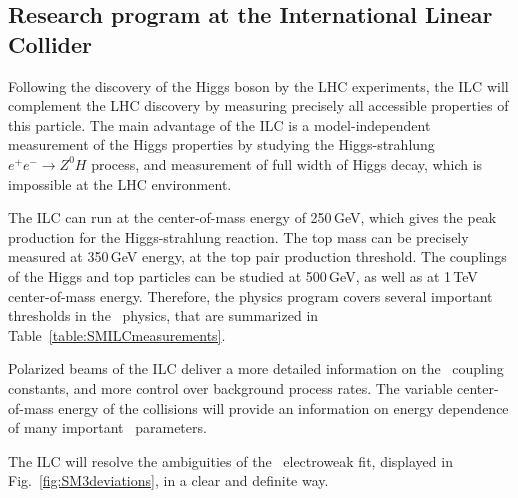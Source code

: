 

\subsection{Research program at the International Linear Collider}

Following the discovery of the Higgs boson by the LHC experiments, the ILC will complement the LHC discovery by measuring precisely all accessible properties of this particle.
The main advantage of the ILC is a model-independent measurement of the Higgs properties by studying  the Higgs-strahlung $e^+e^-\to Z^0H$ process, and measurement of full width of Higgs decay, which is impossible at the LHC environment. 



The ILC can run at the center-of-mass energy of 250\,GeV, which gives the peak production for the  Higgs-strahlung reaction. 
The top mass can be precisely measured at 350\,GeV energy, at the top pair production threshold. 
The couplings of the Higgs and top particles can be studied at 500\,GeV, as well as at 1\,TeV center-of-mass energy.
Therefore, the physics program covers several important thresholds in the \sm\ physics, that are summarized in Table~\ref{table:SMILCmeasurements}. 



Polarized beams of the ILC deliver a more detailed information on the \sm\ coupling constants, and more control over background process rates. 
The variable center-of-mass energy of the collisions will provide an information on energy dependence of many important \sm\ parameters. 
 
The ILC will resolve the ambiguities of the \sm\ electroweak fit, displayed in Fig.~\ref{fig:SM3deviations}, in a clear and definite way. 

